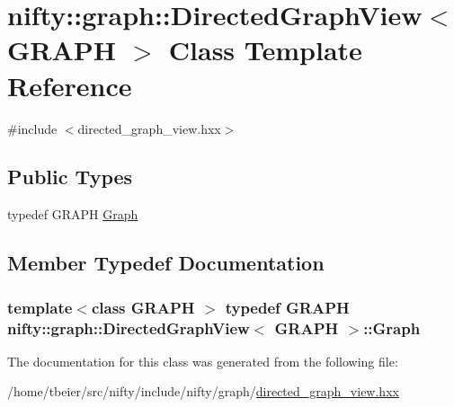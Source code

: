 \hypertarget{classnifty_1_1graph_1_1DirectedGraphView}{}\section{nifty\+:\+:graph\+:\+:Directed\+Graph\+View$<$ G\+R\+A\+P\+H $>$ Class Template Reference}
\label{classnifty_1_1graph_1_1DirectedGraphView}


{\ttfamily \#include $<$directed\+\_\+graph\+\_\+view.\+hxx$>$}

\subsection*{Public Types}
\begin{DoxyCompactItemize}
\item 
typedef G\+R\+A\+P\+H \hyperlink{classnifty_1_1graph_1_1DirectedGraphView_a134f616adad04d9389cdada67b2b72a6}{Graph}
\end{DoxyCompactItemize}


\subsection{Member Typedef Documentation}
\hypertarget{classnifty_1_1graph_1_1DirectedGraphView_a134f616adad04d9389cdada67b2b72a6}{}
\subsubsection[{Graph}]{\setlength{\rightskip}{0pt plus 5cm}template$<$class G\+R\+A\+P\+H $>$ typedef G\+R\+A\+P\+H {\bf nifty\+::graph\+::\+Directed\+Graph\+View}$<$ G\+R\+A\+P\+H $>$\+::{\bf Graph}}\label{classnifty_1_1graph_1_1DirectedGraphView_a134f616adad04d9389cdada67b2b72a6}


The documentation for this class was generated from the following file\+:\begin{DoxyCompactItemize}
\item 
/home/tbeier/src/nifty/include/nifty/graph/\hyperlink{directed__graph__view_8hxx}{directed\+\_\+graph\+\_\+view.\+hxx}\end{DoxyCompactItemize}
